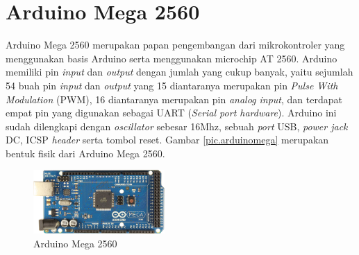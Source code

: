 \section{Arduino Mega 2560}
Arduino Mega 2560  merupakan papan pengembangan dari mikrokontroler yang menggunakan basis Arduino serta menggunakan microchip AT 2560. Arduino  memiliki pin \textit{input} dan \textit{output} dengan jumlah yang cukup banyak, yaitu sejumlah 54 buah pin \textit{input} dan \textit{output} yang 15 diantaranya merupakan pin \textit{Pulse With Modulation} (PWM), 16 diantaranya merupakan pin \textit{analog input}, dan terdapat empat pin yang digunakan sebagai UART (\textit{Serial port hardware}). Arduino ini sudah dilengkapi dengan \textit{oscillator} sebesar 16Mhz, sebuah \textit{port} USB, \textit{power jack} DC, ICSP \textit{header} serta tombol reset\cite{arduino}. Gambar \ref{pic.arduinomega} merupakan bentuk fisik dari Arduino Mega 2560.
	\begin{figure}[H]
	\centering
	\includegraphics[width=5cm]{gambar/arduino_mega.jpg}
	\caption{Arduino Mega 2560\cite{arduino}}
	\label{pic.arudinomega}
	\end{figure}

